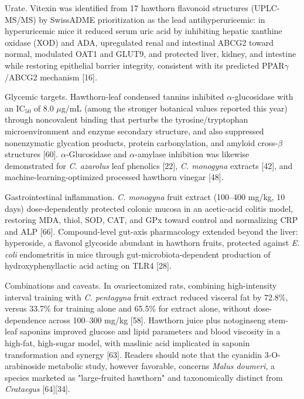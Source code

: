 \documentclass[11pt]{article}
\begin{document}
Urate. Vitexin was identified from 17 hawthorn flavonoid structures (UPLC-MS/MS) by SwissADME prioritization as the lead antihyperuricemic: in hyperuricemic mice it reduced serum uric acid by inhibiting hepatic xanthine oxidase (XOD) and ADA, upregulated renal and intestinal ABCG2 toward normal, modulated OAT1 and GLUT9, and protected liver, kidney, and intestine while restoring epithelial barrier integrity, consistent with its predicted PPAR$\gamma$/ABCG2 mechanism [16].

Glycemic targets. Hawthorn-leaf condensed tannins inhibited $\alpha$-glucosidase with an IC$_{50}$ of 8.0 $\mu$g/mL (among the stronger botanical values reported this year) through noncovalent binding that perturbs the tyrosine/tryptophan microenvironment and enzyme secondary structure, and also suppressed nonenzymatic glycation products, protein carbonylation, and amyloid cross-$\beta$ structures [60]. $\alpha$-Glucosidase and $\alpha$-amylase inhibition was likewise demonstrated for \emph{C. azarolus} leaf phenolics [22], \emph{C. monogyna} extracts [42], and machine-learning-optimized processed hawthorn vinegar [48].

Gastrointestinal inflammation. \emph{C. monogyna} fruit extract (100--400 mg/kg, 10 days) dose-dependently protected colonic mucosa in an acetic-acid colitis model, restoring MDA, thiol, SOD, CAT, and GPx toward control and normalizing CRP and ALP [66]. Compound-level gut-axis pharmacology extended beyond the liver: hyperoside, a flavonol glycoside abundant in hawthorn fruits, protected against \emph{E. coli} endometritis in mice through gut-microbiota-dependent production of hydroxyphenyllactic acid acting on TLR4 [28].

Combinations and caveats. In ovariectomized rats, combining high-intensity interval training with \emph{C. pentagyna} fruit extract reduced visceral fat by 72.8\%, versus 33.7\% for training alone and 65.5\% for extract alone, without dose-dependence across 100--300 mg/kg [58]. Hawthorn juice plus notoginseng stem-leaf saponins improved glucose and lipid parameters and blood viscosity in a high-fat, high-sugar model, with maslinic acid implicated in saponin transformation and synergy [63]. Readers should note that the cyanidin 3-O-arabinoside metabolic study, however favorable, concerns \emph{Malus doumeri}, a species marketed as "large-fruited hawthorn" and taxonomically distinct from \emph{Crataegus} [64][34].
\end{document}
